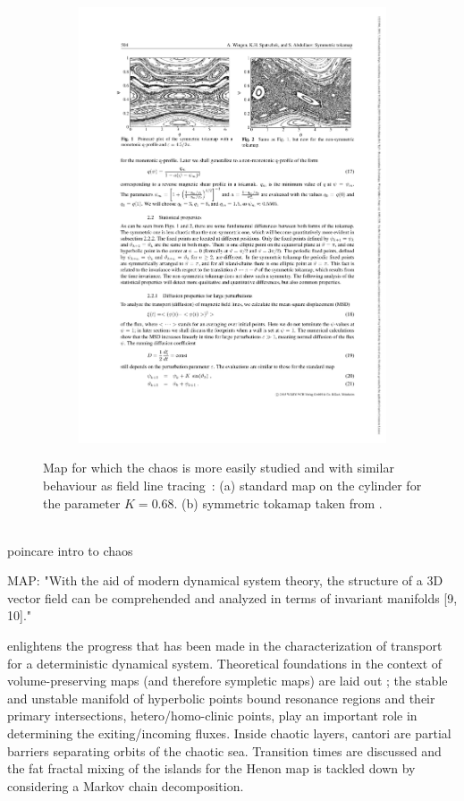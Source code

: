 \begin{figure}[h!]
\begin{subfigure}[t]{0.56\textwidth}
        \includegraphics[width=\textwidth]{images/intro/tokamap.pdf}
        \caption{}
        \label{fig:tokamap}
    \end{subfigure}
    \caption{Map for which the chaos is more easily studied and with similar behaviour as field line tracing~: (a) standard map on the cylinder for the parameter $K=0.68$. (b) symmetric tokamap taken from \cite{wingen_stochastic_2005}.}
    \label{fig:mapping-the-chaos}
\end{figure}

\\[10pt]
poincare \cite{poincare_methodes_1892} intro to chaos

MAP: "With the aid of modern dynamical system theory, the structure of a 3D vector field can be comprehended and analyzed in terms of invariant manifolds [9, 10]." 

\cite{meiss_thirty_2015} enlightens the progress that has been made in the characterization of transport for a deterministic dynamical system. Theoretical foundations in the context of volume-preserving maps (and therefore sympletic maps) are laid out ; the stable and unstable manifold of hyperbolic points bound resonance regions and their primary intersections, hetero/homo-clinic points, play an important role in determining the exiting/incoming fluxes. Inside chaotic layers, cantori are partial barriers separating orbits of the chaotic sea. Transition times are discussed and the fat fractal mixing of the islands for the Henon map is tackled down by considering a Markov chain decomposition.

